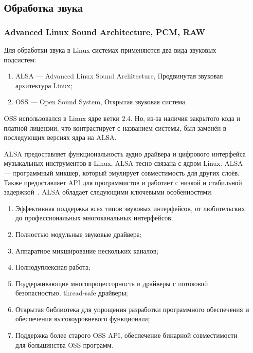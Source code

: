 \subsection{Обработка звука}

\subsubsection{Advanced Linux Sound Architecture, PCM, RAW}

Для обработки звука в Linux-системах применяются два вида звуковых подсистем:

\begin{enumerate}
  \item ALSA --- Advanced Linux Sound Architecture, Продвинутая звуковая архитектура Linux;
  \item OSS --- Open Sound System, Открытая звуковая система.
\end{enumerate}

OSS использовался в Linux ядре ветки 2.4. Но, из-за наличия закрытого кода и платной лицензии, что контрастирует с названием системы, был заменён в последующих версиях ядра на ALSA.

ALSA предоставляет функциональность аудио драйвера и цифрового интерфейса музыкальных инструментов в Linux. ALSA тесно связана с ядром Linux. ALSA — программный микшер, который эмулирует совместимость для других слоёв. Также предоставляет API для программистов и работает с низкой и стабильной задержкой~\cite{alsa-project}. ALSA обладает следующими ключевыми особенностями:

\begin{enumerate}
  \item Эффективная поддержка всех типов звуковых интерфейсов, от любительских до профессиональных многоканальных интерфейсов;
  \item Полностью модульные звуковые драйвера;
  \item Аппаратное микширование нескольких каналов;
  \item Полнодуплексная работа;
  \item Поддерживающие многопроцессорность и драйверы с потоковой безопасностью, thread-safe драйверы;
  \item Открытая библиотека для упрощения разработки программного обеспечения и обеспечения высокоуровневого функционала;
  \item Поддержка более старого OSS API, обеспечение бинарной совместимости для большинства OSS программ.
\end{enumerate}

